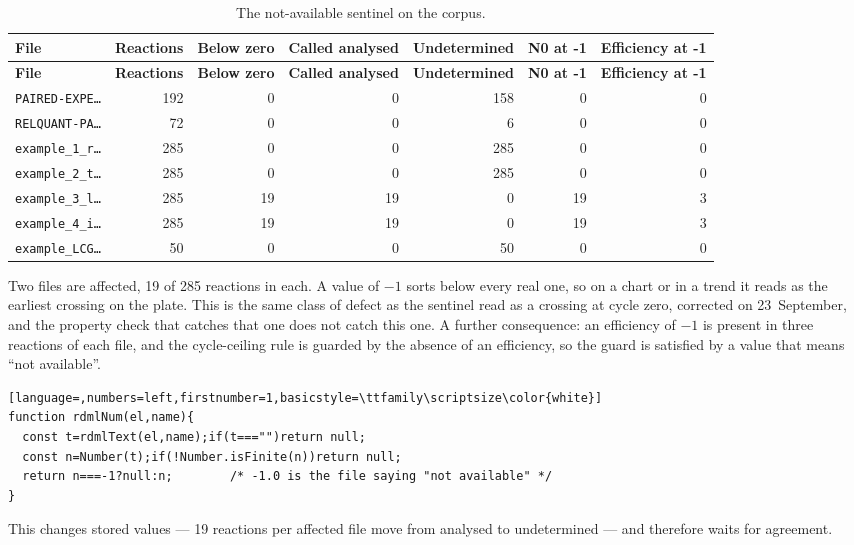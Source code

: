 {\small
\begin{xltabular}{\linewidth}{|X|r|r|r|r|r|r|}
\caption{The not-available sentinel on the corpus.}\label{tab:d3-sentinel} \\
\toprule \textbf{File} & \textbf{Reactions} & \textbf{Below zero} & \textbf{Called analysed} & \textbf{Undetermined} & \textbf{N0 at -1} & \textbf{Efficiency at -1} \\\midrule\endfirsthead
\toprule \textbf{File} & \textbf{Reactions} & \textbf{Below zero} & \textbf{Called analysed} & \textbf{Undetermined} & \textbf{N0 at -1} & \textbf{Efficiency at -1} \\\midrule\endhead
\texttt{PAIRED-EXPE…} & 192 & 0 & 0 & 158 & 0 & 0 \\
\texttt{RELQUANT-PA…} & 72 & 0 & 0 & 6 & 0 & 0 \\
\texttt{example\_1\_r…} & 285 & 0 & 0 & 285 & 0 & 0 \\
\texttt{example\_2\_t…} & 285 & 0 & 0 & 285 & 0 & 0 \\
\texttt{example\_3\_l…} & 285 & 19 & 19 & 0 & 19 & 3 \\
\texttt{example\_4\_i…} & 285 & 19 & 19 & 0 & 19 & 3 \\
\texttt{example\_LCG…} & 50 & 0 & 0 & 50 & 0 & 0 \\
\bottomrule
\end{xltabular}}


Two files are affected, 19 of 285 reactions in each. A value of $-1$ sorts below
every real one, so on a chart or in a trend it reads as the earliest crossing on
the plate. This is the same class of defect as the sentinel read as a crossing at
cycle zero, corrected on 23~September, and the property check that catches that one
does not catch this one. A further consequence: an efficiency of $-1$ is present in
three reactions of each file, and the cycle-ceiling rule is guarded by the absence
of an efficiency, so the guard is satisfied by a value that means ``not available''.


\begin{lstlisting}[language=,numbers=left,firstnumber=1,basicstyle=\ttfamily\scriptsize\color{white}]
function rdmlNum(el,name){
  const t=rdmlText(el,name);if(t==="")return null;
  const n=Number(t);if(!Number.isFinite(n))return null;
  return n===-1?null:n;        /* -1.0 is the file saying "not available" */
}
\end{lstlisting}


This changes stored values --- 19 reactions per affected file move from analysed to
undetermined --- and therefore waits for agreement.


